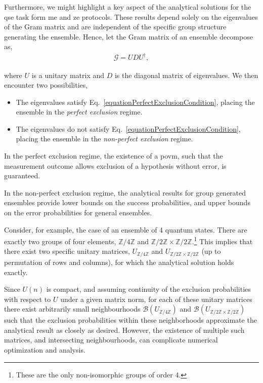 \documentclass[12pt,letterpaper]{article}
\begin{document}
Furthermore, we might highlight a key aspect of the analytical solutions for the \gls{qse} task form \gls{me} and \gls{ze} protocols. These results depend solely on the eigenvalues of the Gram matrix and are independent of the specific group structure generating the ensemble. Hence, let the Gram matrix of an ensemble decompose as,
\begin{align*}
	\mathcal{G} = U D U^\dagger,
\end{align*}

where $U$ is a unitary matrix and $D$ is the diagonal matrix of eigenvalues. We then encounter two possibilities,
\begin{itemize}
	\item The eigenvalues satisfy Eq.~\eqref{equationPerfectExclusionCondition}, placing the ensemble in the \emph{perfect exclusion} regime.
	\item The eigenvalues do not satisfy Eq.~\eqref{equationPerfectExclusionCondition}, placing the ensemble in the \emph{non-perfect exclusion} regime.
\end{itemize}

In the perfect exclusion regime, the existence of a \gls{povm}, such that the measurement outcome allows exclusion of a hypothesis without error, is guaranteed.

In the non-perfect exclusion regime, the analytical results for group generated ensembles provide lower bounds on the success probabilities, and upper bounds on the error probabilities for general ensembles.

Consider, for example, the case of an ensemble of 4 quantum states. There are exactly two groups of four elements, $\mathbb{Z}/4\mathbb{Z}$ and $\mathbb{Z}/2\mathbb{Z} \times \mathbb{Z}/2\mathbb{Z}$.\footnote{These are the only non-isomorphic groups of order 4.} This implies that there exist two specific unitary matrices, $U_{\mathbb{Z}/4\mathbb{Z}}$ and $U_{\mathbb{Z}/2\mathbb{Z} \times \mathbb{Z}/2\mathbb{Z}}$ (up to permutation of rows and columns), for which the analytical solution holds exactly.

Since $U(n)$ is compact, and assuming continuity of the exclusion probabilities with respect to $U$ under a given matrix norm, for each of these unitary matrices there exist arbitrarily small neighbourhoods $\mathcal{B}(U_{\mathbb{Z}/4\mathbb{Z}})$ and $\mathcal{B}(U_{\mathbb{Z}/2\mathbb{Z} \times \mathbb{Z}/2\mathbb{Z}})$ such that the exclusion probabilities within these neighborhoods approximate the analytical result as closely as desired. However, the existence of multiple such matrices, and intersecting neighbourhoods, can complicate numerical optimization and analysis.
\end{document}
